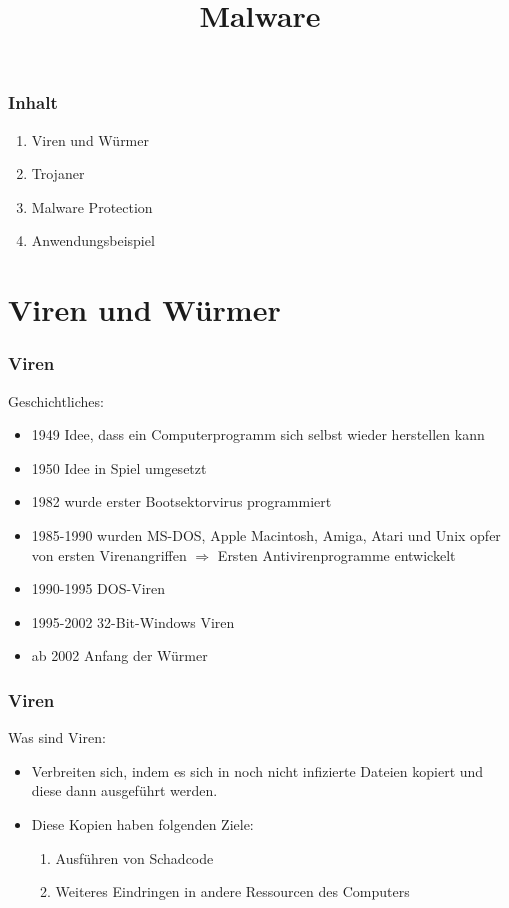 \documentclass{beamer}
\title{Malware}
\author{}
\date{}
\begin{document}
\maketitle
\begin{frame}
	\frametitle{Inhalt}
	\begin{enumerate}
		\item Viren und Würmer
		\item Trojaner
		\item Malware Protection
		\item Anwendungsbeispiel
	\end{enumerate}
\end{frame}


\section{Viren und Würmer}
\begin{frame}
	\frametitle{Viren}
		\begin{block}{Geschichtliches:}
			\begin{itemize}
				\item 1949 Idee, dass ein Computerprogramm sich selbst wieder herstellen kann
				\item 1950 Idee in Spiel umgesetzt
				\item 1982 wurde erster Bootsektorvirus programmiert
				\item 1985-1990 wurden  MS-DOS, Apple Macintosh, Amiga, Atari und Unix opfer von ersten Virenangriffen
				$\Rightarrow$ Ersten Antivirenprogramme entwickelt
				\item 1990-1995 DOS-Viren
				\item 1995-2002 32-Bit-Windows Viren
				\item ab 2002 Anfang der Würmer
			\end{itemize}
		\end{block}
\end{frame}

\begin{frame}
	\frametitle{Viren}
		\begin{block}{Was sind Viren:}
			\begin{itemize}
				\item Verbreiten sich, indem es sich in noch nicht infizierte Dateien kopiert und diese dann ausgeführt werden.
				\item Diese Kopien haben folgenden Ziele:
				\begin{enumerate}
					\item Ausführen von Schadcode
					\item Weiteres Eindringen in andere Ressourcen des Computers
				\end{enumerate}
			\end{itemize}
		\end{block}
\end{frame}
\end{document}
